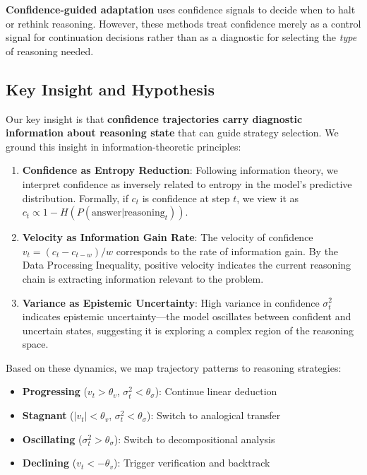 \documentclass{article}
\begin{document}
\textbf{Confidence-guided adaptation} \citep{jin2024corefine,mohtashami2025confidence} uses confidence signals to decide when to halt or rethink reasoning. However, these methods treat confidence merely as a control signal for continuation decisions rather than as a diagnostic for selecting the \textit{type} of reasoning needed.

\subsection{Key Insight and Hypothesis}

Our key insight is that \textbf{confidence trajectories carry diagnostic information about reasoning state} that can guide strategy selection. We ground this insight in information-theoretic principles:

\begin{enumerate}
    \item \textbf{Confidence as Entropy Reduction}: Following information theory, we interpret confidence as inversely related to entropy in the model's predictive distribution. Formally, if $c_t$ is confidence at step $t$, we view it as $c_t \propto 1 - H(P(\text{answer}|\text{reasoning}_t))$.
    
    \item \textbf{Velocity as Information Gain Rate}: The velocity of confidence $v_t = (c_t - c_{t-w}) / w$ corresponds to the rate of information gain. By the Data Processing Inequality, positive velocity indicates the current reasoning chain is extracting information relevant to the problem.
    
    \item \textbf{Variance as Epistemic Uncertainty}: High variance in confidence $\sigma_t^2$ indicates epistemic uncertainty---the model oscillates between confident and uncertain states, suggesting it is exploring a complex region of the reasoning space.
\end{enumerate}

Based on these dynamics, we map trajectory patterns to reasoning strategies:
\begin{itemize}
    \item \textbf{Progressing} ($v_t > \theta_v$, $\sigma_t^2 < \theta_\sigma$): Continue linear deduction
    \item \textbf{Stagnant} ($|v_t| < \theta_v$, $\sigma_t^2 < \theta_\sigma$): Switch to analogical transfer
    \item \textbf{Oscillating} ($\sigma_t^2 > \theta_\sigma$): Switch to decompositional analysis
    \item \textbf{Declining} ($v_t < -\theta_v$): Trigger verification and backtrack
\end{itemize}
\end{document}
